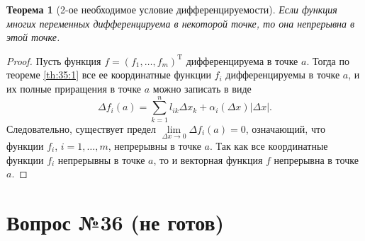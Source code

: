 \documentclass[12pt]{report}
\numberwithin{equation}{section}
\newtheorem{theorem}{Теорема}[section]
\begin{document}
\begin{theorem}[2-ое необходимое условие дифференцируемости] \label{th:35:2}
Если функция многих переменных дифференцируема в некоторой точке, то она непрерывна в этой точке.
\end{theorem}
\begin{proof}
Пусть функция $f = (f_1, \ldots, f_m)^{\mathrm{T}}$ дифференцируема в точке $a$. Тогда по теореме \ref{th:35:1} все ее координатные функции $f_i$ дифференцируемы в точке $a$, и их полные приращения в точке $a$ можно записать в виде
\[ \Delta f_i (a) = \sum_{k =1}^n l_{ik} \Delta x_k + \alpha_i(\Delta x)|\Delta x|.\]
Следовательно, существует предел $\lim\limits_{\Delta x \to 0}\Delta f_i(a) = 0$, означающий, что функции $f_i$, $i = 1, \ldots, m$, непрерывны в точке $a$. Так как все координатные функции $f_i$ непрерывны в точке $a$, то и векторная функция $f$ непрерывна в точке $a$.
\end{proof}

\newpage \section{Вопрос №36 (не готов)} %
\end{document}
